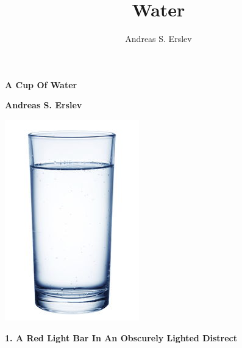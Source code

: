 \documentclass[]{article}
\title{Water}
\author{Andreas S. Erslev}
\begin{document}
	
	\begin{center}
		\Large\textbf{A Cup Of Water}
	\end{center}
	\begin{center}
		\large\textbf{Andreas S. Erslev}
	\end{center}
	
	\begin{center}
		\includegraphics{water4}
	\end{center}
	
	
	\begin{center}
		\large\textbf{1. A Red Light Bar In An \newline Obscurely Lighted Distrect}
	\end{center}
	
\end{document}
